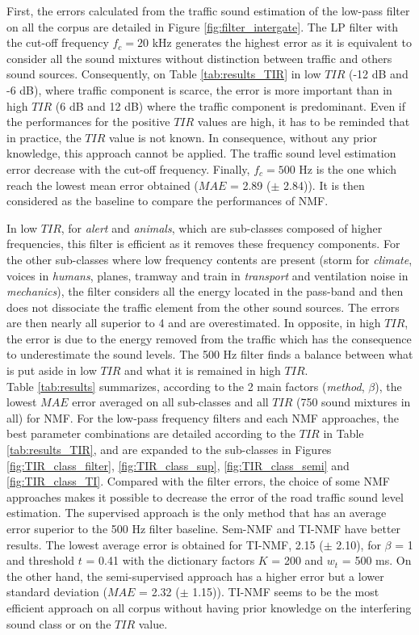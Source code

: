 \documentclass[twocolumn]{svjour3}          %
\begin{document}
First, the errors calculated from the traffic sound estimation of the low-pass filter on all the corpus are detailed in Figure \ref{fig:filter_intergate}. The LP filter with the cut-off frequency $f_c = 20 $ kHz generates the highest error as it is equivalent to consider all the sound mixtures without distinction between traffic and others sound sources. Consequently, on Table \ref{tab:results_TIR} in low $TIR$ (-12 dB and -6 dB), where traffic component is scarce, the error is more important than in high $TIR$ (6 dB and 12 dB) where the traffic component is predominant. Even if the performances for the positive $TIR$ values are high, it has to be reminded that in practice, the $TIR$ value is not known. In consequence, without any prior knowledge, this approach cannot be applied. The traffic sound level estimation error decrease with the cut-off frequency. Finally, $f_c = 500$ Hz is the one which reach the lowest mean error obtained ($MAE$ = 2.89 ($\pm$ 2.84)). It is then considered as the baseline to compare the performances of NMF.

In low $TIR$, for \textit{alert} and \textit{animals}, which are sub-classes composed of higher frequencies, this filter is efficient as it removes these frequency components. For the other sub-classes where low frequency contents are present (storm for \textit{climate}, voices in \textit{humans}, planes, tramway and train in \textit{transport} and ventilation noise in \textit{mechanics}), the filter considers all the energy located in the pass-band and then does not dissociate the traffic element from the other sound sources. The errors are then nearly all superior to 4 and are overestimated. In opposite, in high $TIR$, the error is due to the energy removed from the traffic which has the consequence to underestimate the sound levels. The 500 Hz filter finds a balance between what is put aside in low $TIR$ and what it is remained in high $TIR$. \\

Table \ref{tab:results} summarizes, according to the 2 main factors (\textit{method}, $\beta$), the lowest $MAE$ error averaged on all sub-classes and all $TIR$ (750 sound mixtures in all) for NMF. For the low-pass frequency filters and each NMF approaches, the best parameter combinations are detailed according to the $TIR$ in Table \ref{tab:results_TIR},  and are expanded to the sub-classes in Figures \ref{fig:TIR_class_filter}, \ref{fig:TIR_class_sup}, \ref{fig:TIR_class_semi} and \ref{fig:TIR_class_TI}. Compared with the filter errors, the choice of some NMF approaches makes it possible to decrease the error of the road traffic sound level estimation. The supervised approach is the only method that has an average error superior to the 500 Hz filter baseline. Sem-NMF and TI-NMF have better results. The lowest average error is obtained for TI-NMF,  2.15 ($\pm$ 2.10), for $\beta$ = 1 and threshold $t$ = 0.41 with the dictionary factors $K$ = 200 and $w_t$ = 500 ms. On the other hand, the semi-supervised approach has a higher error but a lower standard deviation ($MAE$ = 2.32 ($\pm$ 1.15)). TI-NMF seems to be the most efficient approach on all corpus without having prior knowledge on the interfering sound class or on the $TIR$ value.
\end{document}
